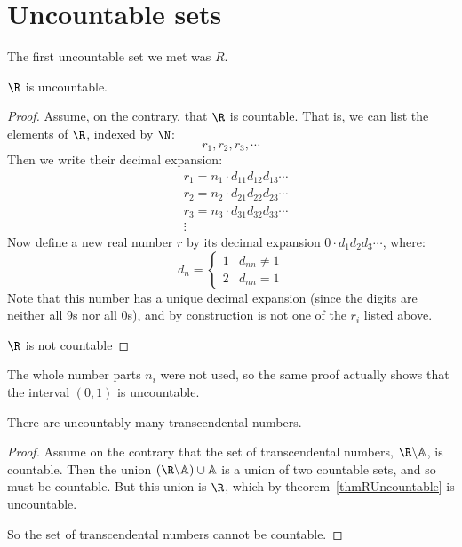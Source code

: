 \documentclass[../Main.tex]{subfiles}
\begin{document}
\section{Uncountable sets}
The first uncountable set we met was $R$.
\begin{theorem}
    $\R$ is uncountable.
    \label{thmRUncountable}
\end{theorem}
\begin{proof}
    Assume, on the contrary, that $\R$ is countable. That is, we can list the elements of $\R$, indexed by $\N$:
    \begin{equation*}
        r_1, r_2, r_3, \cdots
    \end{equation*}
    Then we write their decimal expansion:
    \begin{align*}
        &r_1 = n_1 \cdot d_{11} d_{12} d_{13} \cdots \\
        &r_2 = n_2 \cdot d_{21} d_{22} d_{23} \cdots \\
        &r_3 = n_3 \cdot d_{31} d_{32} d_{33} \cdots \\
        &\vdots
    \end{align*}
    Now define a new real number $r$ by its decimal expansion $0\cdot d_1 d_2 d_3 \cdots$, where:
    \begin{equation*}
        d_n=
        \begin{cases}
            1 & d_{nn} \neq 1 \\
            2 & d_{nn} = 1
        \end{cases}
    \end{equation*}
    Note that this number has a unique decimal expansion (since the digits are neither all 9s nor all 0s), and by construction is not one of the $r_i$ listed above.\contradiction\par
    $\R$ is not countable
\end{proof}
\begin{remark}
    The whole number parts $n_i$ were not used, so the same proof actually shows that the interval $(0,1)$ is uncountable.
\end{remark}
\begin{corollary}
    \label{corTranscUncountable}
    There are uncountably many transcendental numbers.
\end{corollary}
\begin{proof}
    Assume on the contrary that the set of transcendental numbers, $\R \backslash \A$, is countable.
    Then the union $(\R \backslash \A) \cup \A$ is a union of two countable sets, and so must be countable. But this union is $\R$, which by theorem~\ref{thmRUncountable} is uncountable. \contradiction\par
    So the set of transcendental numbers cannot be countable.
\end{proof}
\end{document}
